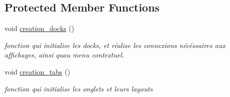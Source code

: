 \subsection*{Protected Member Functions}
\begin{DoxyCompactItemize}
\item 
\mbox{\label{class_fen_principale_ab3ef99b1adb06c0bcc57ea74ca34923e}} 
void \hyperlink{class_fen_principale_ab3ef99b1adb06c0bcc57ea74ca34923e}{creation\+\_\+docks} ()
\begin{DoxyCompactList}\small\item\em fonction qui initialise les docks, et réalise les connexions nécéssaires aux affichages, ainsi qu\textquotesingle{}au menu contextuel. \end{DoxyCompactList}\item 
\mbox{\label{class_fen_principale_aa5ea82e9b0e1c9f93d496cad531ca9e1}} 
void \hyperlink{class_fen_principale_aa5ea82e9b0e1c9f93d496cad531ca9e1}{creation\+\_\+tabs} ()
\begin{DoxyCompactList}\small\item\em fonction qui initialise les onglets et leurs layouts \end{DoxyCompactList}\end{DoxyCompactItemize}
